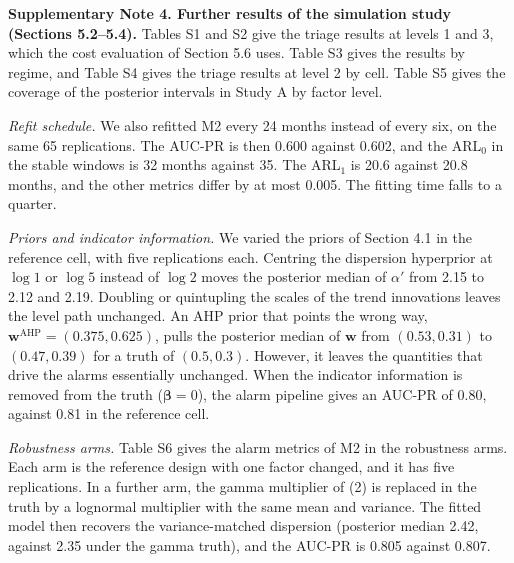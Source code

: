 \documentclass[10pt,a4paper]{article}
\begin{document}
\textbf{Supplementary Note 4. Further results of the simulation study (Sections 5.2--5.4).}
Tables S1 and S2 give the triage results at levels 1 and 3, which the cost evaluation of Section 5.6 uses. Table S3 gives the results by regime, and Table S4 gives the triage results at level 2 by cell. Table S5 gives the coverage of the posterior intervals in Study A by factor level.

\textit{Refit schedule.} We also refitted M2 every 24 months instead of every six, on the same 65 replications. The AUC-PR is then 0.600 against 0.602, and the ARL$_0$ in the stable windows is 32 months against 35. The ARL$_1$ is 20.6 against 20.8 months, and the other metrics differ by at most 0.005. The fitting time falls to a quarter.

\textit{Priors and indicator information.} We varied the priors of Section 4.1 in the reference cell, with five replications each. Centring the dispersion hyperprior at $\log 1$ or $\log 5$ instead of $\log 2$ moves the posterior median of $\alpha'$ from 2.15 to 2.12 and 2.19. Doubling or quintupling the scales of the trend innovations leaves the level path unchanged. An AHP prior that points the wrong way, $\mathbf{w}^{\mathrm{AHP}} = (0.375, 0.625)$, pulls the posterior median of $\mathbf{w}$ from $(0.53, 0.31)$ to $(0.47, 0.39)$ for a truth of $(0.5, 0.3)$. However, it leaves the quantities that drive the alarms essentially unchanged. When the indicator information is removed from the truth ($\boldsymbol{\beta} = 0$), the alarm pipeline gives an AUC-PR of 0.80, against 0.81 in the reference cell.

\textit{Robustness arms.} Table S6 gives the alarm metrics of M2 in the robustness arms. Each arm is the reference design with one factor changed, and it has five replications. In a further arm, the gamma multiplier of (2) is replaced in the truth by a lognormal multiplier with the same mean and variance. The fitted model then recovers the variance-matched dispersion (posterior median 2.42, against 2.35 under the gamma truth), and the AUC-PR is 0.805 against 0.807.
\end{document}
